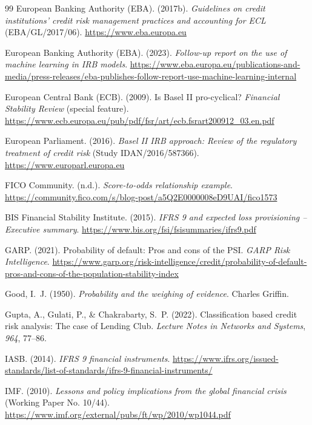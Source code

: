 \documentclass[12pt,a4paper]{report}
\begin{document}
\begin{thebibliography}{99}
European Banking Authority (EBA). (2017b). \textit{Guidelines on credit institutions' credit risk management practices and accounting for ECL} (EBA/GL/2017/06). \url{https://www.eba.europa.eu}

European Banking Authority (EBA). (2023). \textit{Follow-up report on the use of machine learning in IRB models}. \url{https://www.eba.europa.eu/publications-and-media/press-releases/eba-publishes-follow-report-use-machine-learning-internal}

European Central Bank (ECB). (2009). Is Basel II pro-cyclical? \textit{Financial Stability Review} (special feature). \url{https://www.ecb.europa.eu/pub/pdf/fsr/art/ecb.fsrart200912_03.en.pdf}

European Parliament. (2016). \textit{Basel II IRB approach: Review of the regulatory treatment of credit risk} (Study IDAN/2016/587366). \url{https://www.europarl.europa.eu}

FICO Community. (n.d.). \textit{Score-to-odds relationship example}. \url{https://community.fico.com/s/blog-post/a5Q2E0000008eD9UAI/fico1573}

BIS Financial Stability Institute. (2015). \textit{IFRS 9 and expected loss provisioning -- Executive summary}. \url{https://www.bis.org/fsi/fsisummaries/ifrs9.pdf}

GARP. (2021). Probability of default: Pros and cons of the PSI. \textit{GARP Risk Intelligence}. \url{https://www.garp.org/risk-intelligence/credit/probability-of-default-pros-and-cons-of-the-population-stability-index}

Good, I.~J. (1950). \textit{Probability and the weighing of evidence}. Charles Griffin.

Gupta, A., Gulati, P., \& Chakrabarty, S.~P. (2022). Classification based credit risk analysis: The case of Lending Club. \textit{Lecture Notes in Networks and Systems}, \textit{964}, 77--86.

IASB. (2014). \textit{IFRS 9 financial instruments}. \url{https://www.ifrs.org/issued-standards/list-of-standards/ifrs-9-financial-instruments/}

IMF. (2010). \textit{Lessons and policy implications from the global financial crisis} (Working Paper No. 10/44). \url{https://www.imf.org/external/pubs/ft/wp/2010/wp1044.pdf}


\end{thebibliography}
\end{document}
